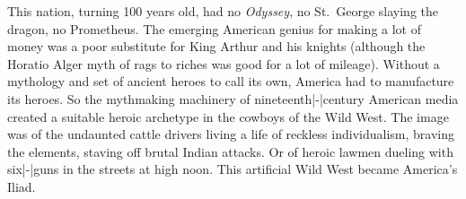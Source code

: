 This nation, turning 100 years old, had no {\em Odyssey}, no
St.~George slaying the dragon, no Prometheus. The emerging American
genius for making a lot of money was a poor substitute for King
Arthur and his knights (although the Horatio Alger myth of rags to
riches was good for a lot of mileage). Without a mythology and set
of ancient heroes to call its own, America had to manufacture its
heroes. So the mythmaking machinery of nineteenth|-|century American
media created a suitable heroic archetype in the cowboys of the Wild
West. The image was of the undaunted cattle drivers living a life of
reckless individualism, braving the elements, staving off brutal
Indian attacks. Or of heroic lawmen dueling with six|-|guns in the
streets at high noon. This artificial Wild West became America's
Iliad.